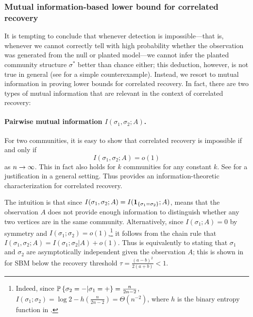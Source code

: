 \subsubsection{Mutual information-based lower bound for correlated recovery}
It is tempting to conclude that whenever detection is impossible---that is, whenever we cannot correctly tell with high probability 
whether the observation was generated from the null or planted model---we cannot infer the planted community structure $\sigma^*$ better than chance either; this deduction, however, is not true in general 
(see \cite[Section III.D]{Banks16} for a simple counterexample). Instead, we resort
to mutual information in proving lower bounds for correlated recovery. 
In fact, there are two types of mutual information that are relevant in the context of correlated recovery:
	\paragraph{Pairwise mutual information $I(\sigma_1,\sigma_2; A)$.}
	For two communities, it is easy to show that correlated recovery is impossible if and only if 
\begin{equation}
I(\sigma_1,\sigma_2;A) = o(1)
\label{eq:MIcorr2}
\end{equation}
as $n\to\infty$.
This in fact also holds for $k$ communities for any constant $k$. See  for a justification in a general setting.
Thus  provides an information-theoretic characterization for correlated recovery.

The intuition is that since $I(\sigma_1,\sigma_2;A) = I({\mathbf{1}_{\left\{{\sigma_1 = \sigma_2}\right\}}};A)$,  means that 
the observation $A$ does not provide enough information to distinguish whether any two vertices are in the same community. Alternatively, 
since $I(\sigma_1;A)=0$ by symmetry and $I(\sigma_1;\sigma_2)=o(1)$,\footnote{Indeed, since $\mathbb{P}\left\{ \sigma_2=-|\sigma_1=+ \right\} = \frac{n}{2n-2}$, $I(\sigma_1;\sigma_2) = \log 2 - h(\frac{n}{2n-2}) = \Theta(n^{-2})$, where $h$ is the binary entropy function in .} it follows from the chain rule that 
$I(\sigma_1,\sigma_2;A)=I(\sigma_1;\sigma_2|A)+o(1)$. Thus  is equivalently to stating that $\sigma_1$ and $\sigma_2$ are asymptotically independent given the observation $A$; 
this is shown in \cite[Theorem 2.1]{Mossel12} for SBM below the recovery threshold $\tau=\frac{(a-b)^2}{2(a+b)}<1$.



